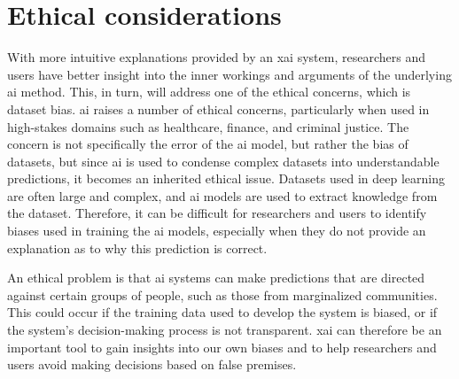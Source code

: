 \label{sec:1_5_ethical_considerations}

\begin{comment}
Ethical considerations in research are a set of principles that guide your research designs and practices. Scientists and researchers must always adhere to a certain code of conduct when collecting data from people. For example, the goals of human research often include understanding real-life phenomena, studying effective treatments, investigating behaviors, and improving lives in other ways. What you decide to research and how you conduct that research involve key ethical considerations such as:

i) protect the rights of research participants (privacy); 
ii) enhance research validity, 
iii) maintain scientific integrity; etc. Thus include here a short description of an assessment of any relevant potential ethical considerations.
\end{comment}

\section{Ethical considerations}


With more intuitive explanations provided by an \gls{xai} system, researchers and users have better insight into the inner workings and arguments of the underlying \gls{ai} method. This, in turn, will address one of the ethical concerns, which is dataset bias. \gls{ai} raises a number of ethical concerns, particularly when used in high-stakes domains such as healthcare, finance, and criminal justice. The concern is not specifically the error of the \gls{ai} model, but rather the bias of datasets, but since \gls{ai} is used to condense complex datasets into understandable predictions, it becomes an inherited ethical issue. 
Datasets used in deep learning are often large and complex, and \gls{ai} models are used to extract knowledge from the dataset. Therefore, it can be difficult for researchers and users to identify biases used in training the \gls{ai} models, especially when they do not provide an explanation as to why this prediction is correct. 


An ethical problem is that \gls{ai} systems can make predictions that are directed against certain groups of people, such as those from marginalized communities. This could occur if the training data used to develop the system is biased, or if the system's decision-making process is not transparent. \gls{xai} can therefore be an important tool to gain insights into our own biases and to help researchers and users avoid making decisions based on false premises. 

